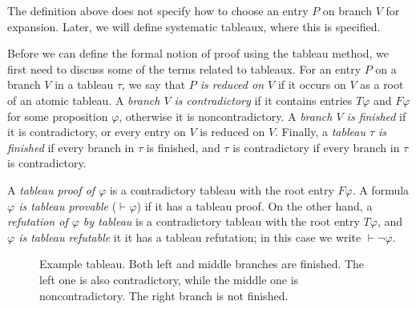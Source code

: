 The definition above does not specify how to choose an entry $P$ on branch $V$ for expansion. Later, we will define systematic tableaux, where this is specified.

Before we can define the formal notion of proof using the tableau method, we first need to discuss some of the terms related to tableaux. For an entry $P$ on a branch $V$ in a tableau $\tau$, we say that \emph{$P$ is reduced on $V$} if it occurs on $V$ as a root of an atomic tableau. A \emph{branch $V$ is contradictory} if it contains entries $T \varphi$ and $F \varphi$ for some proposition $\varphi$, otherwise it is noncontradictory. A \emph{branch $V$ is finished} if it is contradictory, or every entry on $V$ is reduced on $V$. Finally, a \emph{tableau $\tau$ is finished} if every branch in $\tau$ is finished, and $\tau$ is contradictory if every branch in $\tau$ is contradictory.

A \emph{tableau proof of $\varphi$} is a contradictory tableau with the root entry $F \varphi$. A formula \emph{$\varphi$ is tableau provable} ($\vdash \varphi$) if it has a tableau proof. On the other hand, a \emph{refutation of $\varphi$ by tableau} is a contradictory tableau with the root entry $T \varphi$, and \emph{$\varphi$ is tableau refutable} it it has a tableau refutation; in this case we write $\vdash \neg \varphi$.


\begin{figure}
\centering
{}
\caption{Example tableau. Both left and middle branches are finished. The left one is also contradictory, while the middle one is noncontradictory. The right branch is not finished.}
\label{fig:tableau_example}
\end{figure}


